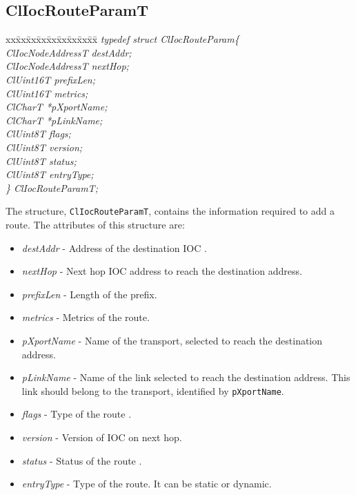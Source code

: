 \begin{flushleft}
\subsection{ClIocRouteParamT}
\begin{tabbing}
xx\=xx\=xx\=xx\=xx\=xx\=xx\=xx\=xx\=\kill
\textit{typedef struct ClIocRouteParam\{}\\
\>\>\>\>\textit{ClIocNodeAddressT destAddr;}\\
\>\>\>\>\textit{ClIocNodeAddressT nextHop;}\\
\>\>\>\>\textit{ClUint16T prefixLen;}\\
\>\>\>\>\textit{ClUint16T metrics;}\\
\>\>\>\>\textit{ClCharT *pXportName;}\\
\>\>\>\>\textit{ClCharT *pLinkName;}\\
\>\>\>\>\textit{ClUint8T flags;}\\
\>\>\>\>\textit{ClUint8T version;}\\
\>\>\>\>\textit{ClUint8T status;}\\
\>\>\>\>\textit{ClUint8T entryType;}\\
\textit{\} ClIocRouteParamT;}\end{tabbing}
The structure, {\tt{ClIocRouteParamT}}, contains the information required to add a route. The attributes of this structure are:
\begin{itemize}
\item
\textit{destAddr} - Address of the destination IOC .
 \item
\textit{nextHop} - Next hop IOC address to reach the destination address.
\item
\textit{prefixLen} - Length of the prefix.
\item
\textit{metrics} - Metrics of the route.
\item
\textit{pXportName} - Name of the transport, selected to reach the destination address.
\item
\textit{pLinkName} - Name of the link selected to reach the destination address. This link
 should belong to the transport, identified by {\tt{pXportName}}.
\item
\textit{flags} - Type of the route .
\item
\textit{version} - Version of IOC on next hop.
\item
\textit{status} - Status of the route .
\item
\textit{entryType} - Type of the route. It can be static or dynamic.
\end{itemize}





\end{flushleft}
